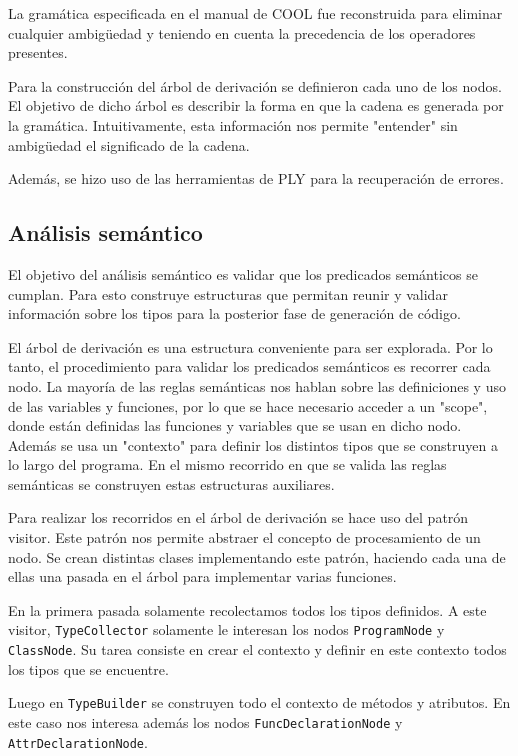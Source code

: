 \documentclass[11pt]{scrartcl} %
\begin{document}
La gramática especificada en el manual de COOL fue reconstruida para eliminar cualquier ambigüedad y teniendo en cuenta la precedencia de los operadores presentes. 

Para la construcción del árbol de derivación se definieron cada uno de los nodos. El objetivo de dicho árbol es describir la forma en que la cadena es generada por la gramática. Intuitivamente, esta información nos permite "entender" sin ambigüedad el significado de la cadena. 

Además, se hizo uso de las herramientas de PLY para la recuperación de errores.

\subsection{Análisis semántico} 

El objetivo del análisis semántico es validar que los predicados semánticos se cumplan. Para esto construye estructuras que permitan reunir y validar información sobre los tipos para la posterior fase de generación de código.

El árbol de derivación es una estructura conveniente para ser explorada. Por lo tanto, el procedimiento para validar los predicados semánticos es recorrer cada nodo. La mayoría de las reglas semánticas nos hablan sobre las definiciones y uso de las variables y funciones, por lo que se hace necesario acceder a un "scope", donde están definidas las funciones y variables que se usan en dicho nodo. Además se usa un "contexto" para definir los distintos tipos que se construyen a lo largo del programa. En el mismo recorrido en que se valida las reglas semánticas se construyen estas estructuras auxiliares.

Para realizar los recorridos en el árbol de derivación se hace uso del patrón visitor. Este patrón nos permite abstraer el concepto de procesamiento de un nodo. Se crean distintas clases implementando este patrón, haciendo cada una de ellas una pasada en el árbol para implementar varias funciones.

En la primera pasada solamente recolectamos todos los tipos definidos. A este visitor, \texttt{TypeCollector} solamente le interesan los nodos \texttt{ProgramNode} y \texttt{ClassNode}. Su tarea consiste en crear el contexto y definir en este contexto todos los tipos que se encuentre.

Luego en \texttt{TypeBuilder} se construyen todo el contexto de métodos y atributos. En este caso nos interesa además los nodos \texttt{FuncDeclarationNode} y \texttt{AttrDeclarationNode}.
\end{document}
